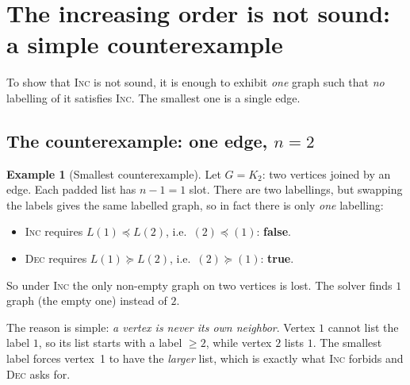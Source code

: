 \documentclass[11pt,a4paper]{article}
\theoremstyle{definition}
\newtheorem{example}[theorem]{Example}
\theoremstyle{remark}
\newcommand{\lex}{\preceq}
\newcommand{\Lst}{L}
\begin{document}
\section{The increasing order is not sound: a simple counterexample}\label{sec:inc}

To show that \textsc{Inc} is not sound, it is enough to exhibit \emph{one} graph such that
\emph{no} labelling of it satisfies \textsc{Inc}. The smallest one is a single edge.

\subsection{The counterexample: one edge, $n=2$}

\begin{example}[Smallest counterexample]\label{ex:inc}
Let $G=K_2$: two vertices joined by an edge. Each padded list has $n-1=1$ slot. There are two
labellings, but swapping the labels gives the same labelled graph, so in fact there is
only \emph{one} labelling:

\begin{center}
\end{center}

\begin{itemize}
  \item \textsc{Inc} requires $\Lst(1)\lex\Lst(2)$, i.e.\ $(2)\lex(1)$: \textbf{\color{red}false}.
  \item \textsc{Dec} requires $\Lst(1)\succeq\Lst(2)$, i.e.\ $(2)\succeq(1)$: \textbf{\color{teal}true}.
\end{itemize}
So under \textsc{Inc} the only non-empty graph on two vertices is lost. The solver finds
$1$ graph (the empty one) instead of $2$.
\end{example}

The reason is simple: \emph{a vertex is never its own neighbor}. Vertex $1$ cannot list
the label $1$, so its list starts with a label $\ge2$, while vertex $2$ lists $1$. The smallest
label forces vertex~1 to have the \emph{larger} list, which is exactly what \textsc{Inc}
forbids and \textsc{Dec} asks for.
\end{document}
